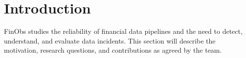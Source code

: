 \section{Introduction}
\label{sec:introduction}
FinObs studies the reliability of financial data pipelines and the need to detect,
understand, and evaluate data incidents. This section will describe the motivation,
research questions, and contributions as agreed by the team.
